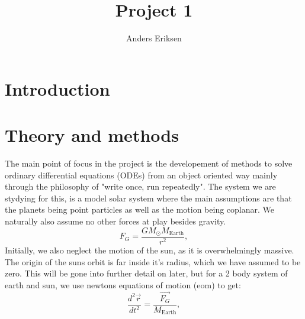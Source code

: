 \documentclass[10pt, twocolumn]{revtex4-1}
\begin{document}
\title{Project 1}
\author{Anders Eriksen}
\begin{abstract}
\end{abstract}
\maketitle


\section{Introduction}

\section{Theory and methods}

The main point of focus in the project is the developement of methods to
solve ordinary differential equations (ODEs) from an object oriented way
mainly through the philosophy of "write once, run repeatedly". The system
we are stydying for this, is a model solar system where the main assumptions
are that the planets being point particles as well as the motion being coplanar. 
We naturally also assume no other forces at play besides gravity. 
\[
F_G=\frac{GM_{\odot}M_{\mathrm{Earth}}}{r^2},
\]
Initially, we also neglect the motion of the sun, as it is overwhelmingly massive.
The origin of the suns orbit is far inside it's radius, which we have assumed to be 
zero. This will be gone into further detail on later, but for a 2 body system of earth 
and sun, we use newtons equations of motion (eom) to get: 
\[
    \frac{d^2\vec{r}}{dt^2}=\frac{\vec{F_{G}}}{M_{\mathrm{Earth}}},
\]
\end{document}
